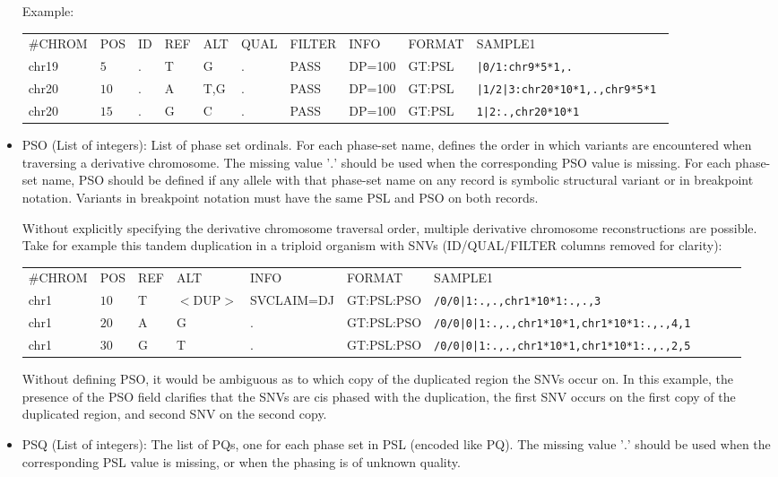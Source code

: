 \documentclass[8pt]{article}
\begin{document}
\begin{itemize}
  Example:
  
  \vspace{0.5em}
  \begin{tabular}{ l l l l l l l l l l}
    \#CHROM & POS & ID & REF & ALT & QUAL & FILTER & INFO & FORMAT & SAMPLE1\\
     chr19 & $5$ & . & T & G & . & PASS & DP=100 &GT:PSL & \tt{|0/1:chr9*5*1,.}\\
    chr20 & $10$ & . & A & T,G & . & PASS & DP=100 &GT:PSL & \tt{|1/2|3:chr20*10*1,.,chr9*5*1} \\
    chr20 & $15$ & . & G & C & . & PASS & DP=100 &GT:PSL & \tt{1|2:.,chr20*10*1}\\
  \end{tabular}
  
  \item PSO (List of integers): List of phase set ordinals.
  For each phase-set name, defines the order in which variants are encountered when traversing a derivative chromosome.
  The missing value '$.$' should be used when the corresponding PSO value is missing.
  For each phase-set name, PSO should be defined if any allele with that phase-set name on any record is symbolic structural variant or in breakpoint notation.
  Variants in breakpoint notation must have the same PSL and PSO on both records.
  
  Without explicitly specifying the derivative chromosome traversal order, multiple derivative chromosome reconstructions are possible.
  Take for example this tandem duplication in a triploid organism with SNVs (ID/QUAL/FILTER columns removed for clarity):
  
  \vspace{0.5em}
  \begin{tabular}{ l l l l l l l l l l}
  \#CHROM & POS & REF & ALT & INFO & FORMAT & SAMPLE1\\
    chr1 & $10$ & T & $<$DUP$>$ & SVCLAIM=DJ & GT:PSL:PSO & \tt{/0/0|1:.,.,chr1*10*1:.,.,3}\\
    chr1 & $20$ & A & G & . & GT:PSL:PSO & \tt{/0/0|0|1:.,.,chr1*10*1,chr1*10*1:.,.,4,1} \\
    chr1 & $30$ & G & T & . & GT:PSL:PSO & \tt{/0/0|0|1:.,.,chr1*10*1,chr1*10*1:.,.,2,5} \\
  \end{tabular}
  
  Without defining PSO, it would be ambiguous as to which copy of the duplicated region the SNVs occur on.
  In this example, the presence of the PSO field clarifies that the SNVs are cis phased with the duplication, the first SNV occurs on the first copy of the duplicated region, and second SNV on the second copy.
  
  \item PSQ (List of integers): The list of PQs, one for each phase set in PSL (encoded like PQ). 
  The missing value '$.$' should be used when the corresponding PSL value is missing, or when the phasing is of unknown quality.
\end{itemize}
\end{document}
